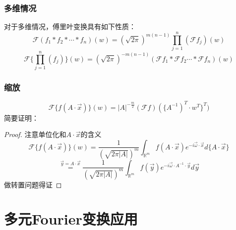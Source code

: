 \documentclass[linespread=1.5,openany]{book}%
\theoremstyle{plain}
\begin{document}
{{{					\subsection{多维情况}
					对于多维情况，傅里叶变换具有如下性质：
					\[
					\mathcal{F}\left( f_1 * f_2 * \cdots * f_n \right)(w) = (\sqrt{2\pi})^{m(n-1)} \prod_{j=1}^n (\mathcal{F}f_j)(w)
					\]\[
					\mathcal{F}\{\prod_{j=1}^n (f_j)\}(w) = (\sqrt{2\pi})^{-m(n-1)} (\mathcal{F}f_1*\mathcal{F}f_2\cdots * \mathcal{F}f_n)(w)
					\]
					
					\subsection{缩放}
					\[
					\mathcal{F}\{f(A\cdot \vec{x})\}(w) = |A|^{-\frac{m}{2}} (\mathcal{F}f)(\{A^{-1})^{T} \cdot w^T\}^T )
					\]简要证明：
					\begin{proof}
						注意单位化和$A\cdot\vec{x}$的含义
						\[	\mathcal{F}\{f(A\cdot \vec{x})\}(w)=\frac{1}{(\sqrt{2\pi |{A}|})^m}\int_{\mathbb{R}^m }^{} f(A\cdot \vec{x}) e^{-i\vec{\omega}\cdot\vec{x}}  d\{A\cdot\vec{x}\}\]
						\[\stackrel{\vec{y}=A\cdot \vec{x}}{=}
						\frac{1}{(\sqrt{2\pi|{A}|})^m}\int_{\mathbb{R}^m}^{ } f( \vec{y}) e^{-i\vec{\omega}\cdot A^{-1}\cdot\vec{y}}  d\vec{y}\]
						做转置问题得证
					\end{proof}
				}
				\chapter{多元Fourier变换应用}{
}}}
\end{document}

